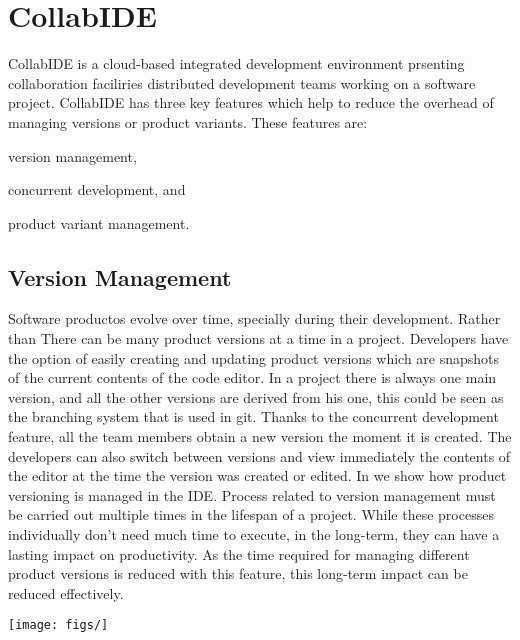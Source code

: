 
\section{CollabIDE}
\label{sec:collab-ide}

CollabIDE is a cloud-based integrated development environment prsenting collaboration faciliries distributed development teams 
working on a software project. CollabIDE has three key features which help to reduce the overhead of managing versions or product variants. These features are:
\begin{enumerate*}[label=(\arabic*)] 
\item version management, 
\item concurrent development, and 
\item product variant management.
\end{enumerate*}

\subsection{Version Management}
Software productos evolve over time, specially during their development. Rather than 
There can be many product versions at a time in a project. Developers have the option of easily creating and updating product versions which are snapshots of the current contents of the code editor. In a project there is always one main version, and all the other versions are derived from his one, this could be seen as the branching system that is used in git. Thanks to the concurrent development feature, all the team members obtain a new version the moment it is created. The developers can also switch between versions and view immediately the contents of the editor at the time the version was created or edited. In  we show how product versioning is managed in the IDE. Process related to version management must be carried out multiple times in the lifespan of a project. While these processes individually don’t need much time to execute, in the long-term, they can have a lasting impact on productivity. As the time required for managing different product versions is reduced with this feature, this long-term impact can be reduced effectively.

\begin{graphics}[htbp]
  \centering
  \texttt{[image: figs/]}
  \caption{}
  \label{fig:}
\end{graphics}

